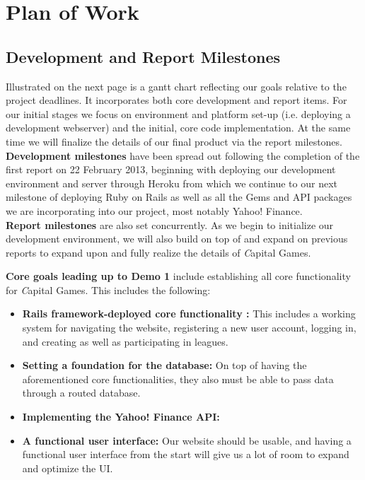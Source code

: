 \chapter{Plan of Work}

\section{Development and Report Milestones}

Illustrated on the next page is a gantt chart reflecting our goals relative
to the project deadlines. It incorporates both core development and report items.
For our initial stages we focus on environment and platform set-up (i.e.
deploying a development webserver) and the initial, core code implementation. At
the same time we will finalize the details of our final product via the report
milestones. \\ 

{\bfseries Development milestones} have been spread out following the completion 
of the first report on 22 February 2013, beginning with deploying our development
 environment and server through Heroku from which we continue to our next 
 milestone of deploying Ruby on Rails as well as all the Gems and API packages we are incorporating into our project, most notably Yahoo! Finance. \\

{\bfseries Report milestones} are also set concurrently. As we begin to initialize
our development environment, we will also build on top of and expand on previous
reports to expand upon and fully realize the details of {\textit Capital Games}.

{\bfseries Core goals leading up to Demo 1} include establishing all core 
functionality for {\textit Capital Games}. This includes the following:
\begin{itemize}
\item {\bfseries Rails framework-deployed core functionality :} This
includes a working system for navigating the website, registering a new
user account, logging in, and creating as well as participating in leagues.
\item {\bfseries Setting a foundation for the database: } On top of having 
the aforementioned core functionalities, they also must be able to pass
data through a routed database.  
\item {\bfseries Implementing the Yahoo! Finance API: }
\item {\bfseries A functional user interface:} Our website should be usable, 
and having a functional user interface from the start will give us a lot of
room to expand and optimize the UI. \\
\end{itemize}


